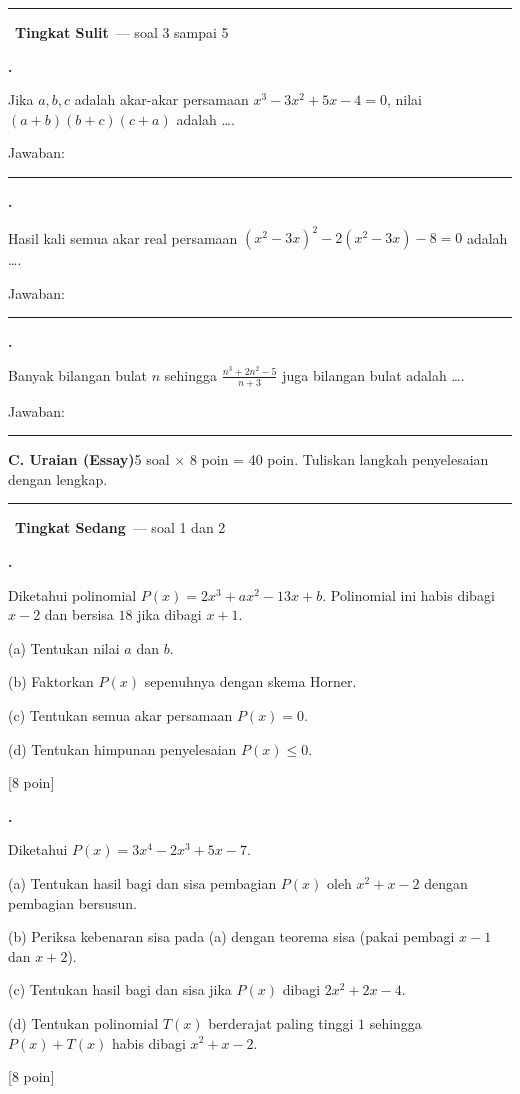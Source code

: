 \documentclass[a4paper,11pt]{article}
\newcommand{\dis}{\displaystyle}
\newcounter{no}
\newcommand{\bagian}[2]{\par\Needspace{6\baselineskip}\vspace{1.0em}\noindent
  \begin{tcolorbox}[colback=redx,colframe=redx,coltext=white,boxrule=0pt,arc=2pt,left=6pt,right=6pt,top=3pt,bottom=3pt]
  \textbf{#1}\hfill{\small #2}\end{tcolorbox}\setcounter{no}{0}\par\vspace{-0.3em}}
\newcommand{\tingkat}[2]{\par\Needspace{7\baselineskip}\vspace{0.6em}\noindent
  {\color{pinkx}\rule{3pt}{1.1em}}\ {\color{redx}\bfseries #1}\ {\small\color{gray}--- #2}\par\vspace{0.1em}}
\newcommand{\soal}[2]{\par\vspace{0.75em}\stepcounter{no}\noindent
  \begin{minipage}[t]{1.8em}\textbf{\theno.}\end{minipage}%
  \begin{minipage}[t]{\dimexpr\linewidth-1.8em\relax}#1\par\vspace{0.35em}#2\end{minipage}\par}
\newcommand{\poin}[1]{\hfill{\small\color{redx}[#1 poin]}}
\newcommand{\jwb}{\hfill Jawaban: \rule{4.5cm}{0.4pt}}
\begin{document}
\tingkat{Tingkat Sulit}{soal 3 sampai 5}
\soal{Jika $a,b,c$ adalah akar-akar persamaan $x^3-3x^2+5x-4=0$, nilai $(a+b)(b+c)(c+a)$ adalah \dots.}{\jwb}
\soal{Hasil kali semua akar real persamaan $(x^2-3x)^2-2(x^2-3x)-8=0$ adalah \dots.}{\jwb}
\soal{Banyak bilangan bulat $n$ sehingga $\dis\frac{n^3+2n^2-5}{n+3}$ juga bilangan bulat adalah \dots.}{\jwb}

\bagian{C. Uraian (Essay)}{5 soal $\times$ 8 poin = 40 poin. Tuliskan langkah penyelesaian dengan lengkap.}

\tingkat{Tingkat Sedang}{soal 1 dan 2}
\soal{Diketahui polinomial $P(x)=2x^3+ax^2-13x+b$. Polinomial ini habis dibagi $x-2$ dan bersisa $18$ jika dibagi $x+1$.\par\smallskip
(a) Tentukan nilai $a$ dan $b$.\par
(b) Faktorkan $P(x)$ sepenuhnya dengan skema Horner.\par
(c) Tentukan semua akar persamaan $P(x)=0$.\par
(d) Tentukan himpunan penyelesaian $P(x)\le0$.}{\poin{8}}
\soal{Diketahui $P(x)=3x^4-2x^3+5x-7$.\par\smallskip
(a) Tentukan hasil bagi dan sisa pembagian $P(x)$ oleh $x^2+x-2$ dengan pembagian bersusun.\par
(b) Periksa kebenaran sisa pada (a) dengan teorema sisa (pakai pembagi $x-1$ dan $x+2$).\par
(c) Tentukan hasil bagi dan sisa jika $P(x)$ dibagi $2x^2+2x-4$.\par
(d) Tentukan polinomial $T(x)$ berderajat paling tinggi $1$ sehingga $P(x)+T(x)$ habis dibagi $x^2+x-2$.}{\poin{8}}
\end{document}
